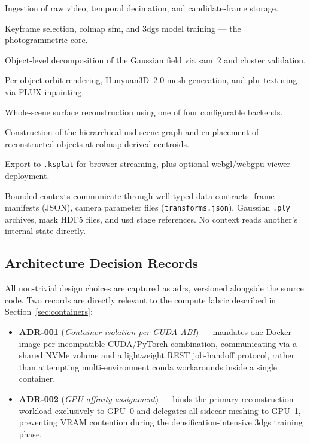 \begin{description}[leftmargin=2.4cm, labelwidth=2.2cm]
  \item[Capture]        Ingestion of raw video, temporal decimation, and candidate-frame storage.
  \item[Reconstruction] Keyframe selection, \acrshort{colmap} \acrshort{sfm}, and
                        \acrshort{3dgs} model training — the photogrammetric core.
  \item[Segmentation]   Object-level decomposition of the Gaussian field via \acrshort{sam}~2
                        and cluster validation.
  \item[Generative-Reconstruction] Per-object orbit rendering, Hunyuan3D~2.0 mesh generation,
                        and \acrshort{pbr} texturing via FLUX inpainting.
  \item[Meshing]        Whole-scene surface reconstruction using one of four configurable backends.
  \item[Assembly]       Construction of the hierarchical \acrshort{usd} scene graph and
                        emplacement of reconstructed objects at \acrshort{colmap}-derived centroids.
  \item[Delivery]       Export to \texttt{.ksplat} for browser streaming, plus optional
                        \acrshort{webgl}/\acrshort{webgpu} viewer deployment.
\end{description}

Bounded contexts communicate through well-typed data contracts: frame manifests (JSON),
camera parameter files (\texttt{transforms.json}), Gaussian \texttt{.ply} archives, mask
HDF5 files, and \acrshort{usd} stage references. No context reads another's internal state directly.

\subsection{Architecture Decision Records}

All non-trivial design choices are captured as \acrfull{adr}s, versioned alongside the
source code. Two records are directly relevant to the compute fabric described in
Section~\ref{sec:containers}:

\begin{itemize}
  \item \textbf{ADR-001} (\emph{Container isolation per CUDA ABI}) — mandates one Docker
        image per incompatible CUDA/\-PyTorch combination, communicating via a shared NVMe
        volume and a lightweight REST job-handoff protocol, rather than attempting
        multi-environment conda workarounds inside a single container.
  \item \textbf{ADR-002} (\emph{GPU affinity assignment}) — binds the primary reconstruction
        workload exclusively to GPU~0 and delegates all sidecar meshing to GPU~1, preventing
        VRAM contention during the densification-intensive \acrshort{3dgs} training phase.
\end{itemize}

